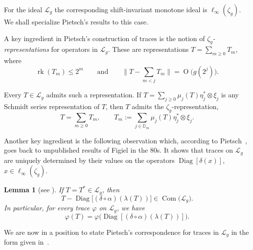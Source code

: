 \documentclass[10pt, a4paper]{amsart}
\newcommand{\D}{\mathbb{D}}
\newcommand{\sL}{\mathscr{L}}
\newcommand{\op}{\operatorname}
\newcommand{\Com}{\op{Com}}
\numberwithin{equation}{section}
\newtheorem{lemma}[theorem]{Lemma}
\theoremstyle{definition}
\theoremstyle{remark}
\newcommand{\Diag}{\op{Diag}}
\begin{document}
For the ideal $\sL_g$ the corresponding shift-invariant monotone ideal is $\ell_\infty(\zeta_g)$. We shall specialize Pietsch's results to this case.

A key ingredient in Pietsch's construction of traces is the notion of \emph{$\zeta_g$-representations} for operators in $\sL_g$. These are representations $T=\sum_{m\geq 0} T_m$, where
 \begin{equation}\label{eq:zeta_g reps}
 \op{rk} (T_m)\leq 2^m \qquad \text{and} \qquad \big\|T -\sum_{m<j} T_m\big\| =\op{O}\big(g(2^j)\big).
\end{equation}

Every $T\in \sL_g$ admits such a representation. If $T=\sum_{j\geq 0} \mu_j(T) \eta_j^*\otimes \xi_j$ is any Schmidt series representation of $T$, then $T$ admits the $\zeta_g$-representation,
\begin{equation}\label{eq:2nd zeta_g reps}
 T=\sum_{m\geq 0}T_m, \qquad T_m:= \sum_{j\in \D_m} \mu_j(T)\eta_j^*\otimes \xi_j.
\end{equation}

Another key ingredient is the following observation which, according to Pietsch~\cite[p.~603]{Pi:IEOT17}, goes back to unpublished results of Figiel in the 80s. It shows that traces on $\sL_g$ are uniquely determined by their values on the operators $\Diag[\delta(x)]$, $x\in \ell_\infty(\zeta_g)$.

\begin{lemma}[see {\cite[Proposition~4.3]{Pi:IEOT17}}] \label{lem:Pietsch.Figiel}
If $T=T^*\in \sL_g$, then
\begin{equation*}
T -\Diag\big[(\delta\circ\alpha)(\lambda(T))\big] \in \Com\big(\sL_g\big).
\end{equation*}
In particular, for every trace $\varphi$ on $\sL_g$, we have
\begin{equation*}
 \varphi(T)= \varphi\big( \Diag[(\delta\circ\alpha)(\lambda(T))]\big).
\end{equation*}
 \end{lemma}

 We are now in a position to state Pietsch's correspondence for traces in $\sL_g$ in the form given in~\cite{Pi:IEOT17}.
\end{document}
